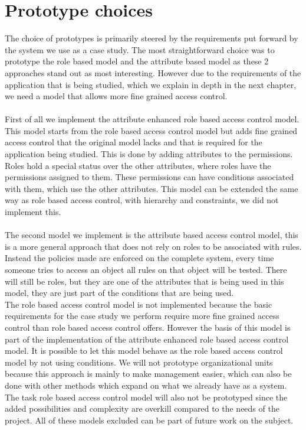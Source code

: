 \section{Prototype choices}
The choice of prototypes is primarily steered by the requirements put forward by the system we use as a case study.
The most straightforward choice was to prototype the role based model and the attribute based model as these 2 approaches stand out as most interesting.
However due to the requirements of the application that is being studied, which we  explain in depth in the next chapter, we need a model that allows more fine grained access control.
\\
\\
First of all we implement the attribute enhanced role based access control model.
This model starts from the role based access control model but adds fine grained access control that the original model lacks and that is required for the application being studied.
This is done by adding attributes to the permissions.
Roles hold a special status over the other attributes, where roles have the permissions assigned to them.
These permissions can have conditions associated with them, which use the other attributes.
This model can be extended the same way as role based access control, with hierarchy and constraints, we did not implement this.
\\
\\
The second model we implement is the attribute based access control model, this is a more general approach that does not rely on roles to be associated with rules. 
Instead the policies made are enforced on the complete system, every time someone tries to access an object all rules on that object will be tested.
There will still be roles, but they are one of the attributes that is being used in this model, they are just part of the conditions that are being used.
\\
The role based access control model is not implemented because the basic requirements for the case study we perform require more fine grained access control than role based access control offers.
However the basis of this model is part of the implementation of the attribute enhanced role based access control model.
It is possible to let this model behave as the role based access control model by not using conditions.
We will not prototype organizational units because this approach is mainly to make management easier, which can also be done with other methods which expand on what we already have as a system.
The task role based access control model will also not be prototyped since the added possibilities and complexity are overkill compared to the needs of the project.
All of these models excluded can be part of future work on the subject.